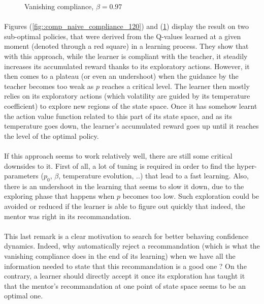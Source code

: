 \documentclass[a4paper]{report}
\begin{document}
{{{{\begin{figure}[ht!]
\begin{minipage}{0.5\linewidth}
\begin{center}
						\caption{Vanishing compliance, $\beta = 0.97$}
						\label{fig::comp_naive_compliance_50}
					\end{center}
				\end{minipage}
			\end{figure}
			
			\paragraph{} Figures (\ref{fig::comp_naive_compliance_120}) and (\ref{fig::comp_naive_compliance_50}) display the result on two sub-optimal policies, that were derived from the Q-values learned at a given moment (denoted through a red square) in a learning process. They show that with this approach, while the learner is compliant with the teacher, it steadily increases its accumulated reward thanks to its exploratory actions. However, it then comes to a plateau (or even an undershoot) when the guidance by the teacher becomes too weak as $p$ reaches a critical level. The learner then mostly relies on its exploratory actions (which volatility are guided by its temperature coefficient) to explore new regions of the state space. Once it has somehow learnt the action value function related to this part of its state space, and as its temperature goes down, the learner's accumulated reward goes up until it reaches the level of the optimal policy. 

		}		
		
		\paragraph{} If this approach seems to work relatively well, there are still some critical downsides to it. First of all, a lot of tuning is required in order to find the hyper-parameters ($p_0$, $\beta$, temperature evolution, ..) that lead to a fast learning. Also, there is an undershoot in the learning that seems to slow it down, due to the exploring phase that happens when $p$ becomes too low.  Such exploration could be avoided or reduced if the learner is able to figure out quickly that indeed, the mentor was right in its recommandation.
		
		\paragraph{} This last remark is a clear motivation to search for better behaving confidence dynamics. Indeed, why automatically reject a recommandation (which is what the vanishing compliance does in the end of its learning) when we have all the information needed to state that this recommandation is a good one ? On the contrary, a learner should directly accept it once its exploration has taught it that the mentor's recommandation at one point of state space seems to be an optimal one.  
	}
	
}}
\end{document}
